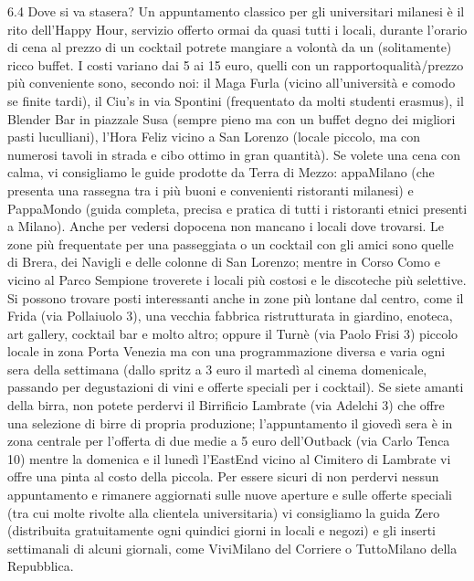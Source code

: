6.4 Dove si va stasera?
Un appuntamento classico per gli universitari milanesi è il rito dell'Happy Hour,  servizio offerto ormai da quasi tutti i locali, durante l'orario di cena al prezzo di un cocktail potrete mangiare a volontà da un (solitamente) ricco buffet. I costi variano dai 5 ai 15 euro, quelli con un rapportoqualità/prezzo più conveniente sono, secondo noi: il Maga Furla (vicino all'università e comodo se finite tardi), il Ciu's in via Spontini (frequentato da molti studenti erasmus), il Blender Bar in piazzale Susa (sempre pieno ma con un buffet degno dei migliori pasti luculliani), l'Hora Feliz vicino a San Lorenzo (locale piccolo, ma con numerosi tavoli in strada e cibo ottimo in gran quantità). Se volete una cena con calma, vi consigliamo le guide prodotte da Terra di Mezzo: appaMilano (che presenta una rassegna tra i più buoni e convenienti ristoranti milanesi) e PappaMondo (guida completa, precisa e pratica di tutti i ristoranti etnici presenti a Milano).
Anche per vedersi dopocena non mancano i locali dove trovarsi. Le zone più frequentate per una passeggiata o un cocktail con gli amici sono quelle di Brera, dei Navigli e delle colonne di San Lorenzo; mentre in Corso Como e vicino al Parco Sempione troverete i locali più costosi e le discoteche più selettive. Si possono trovare posti interessanti anche in zone più lontane dal centro, come il Frida (via Pollaiuolo 3), una vecchia fabbrica ristrutturata in giardino, enoteca, art gallery, cocktail bar e molto altro; oppure il Turnè (via Paolo Frisi 3) piccolo locale in zona Porta Venezia ma con una programmazione diversa e varia ogni sera della settimana (dallo spritz a 3 euro il martedì al cinema domenicale, passando per degustazioni di vini e offerte speciali per i cocktail).
Se siete amanti della birra, non potete perdervi il Birrificio Lambrate (via Adelchi 3) che offre una selezione di birre di propria produzione; l'appuntamento il giovedì sera è in zona centrale per l'offerta di due medie a 5 euro dell'Outback (via Carlo Tenca 10) mentre la domenica e il lunedì l'EastEnd vicino al Cimitero di Lambrate vi offre una pinta al costo della piccola. Per essere sicuri di non perdervi nessun appuntamento e rimanere aggiornati sulle nuove aperture e sulle offerte speciali (tra cui molte rivolte alla clientela universitaria) vi consigliamo la guida Zero (distribuita gratuitamente ogni quindici giorni in locali e negozi) e gli inserti settimanali di alcuni giornali, come ViviMilano del Corriere o TuttoMilano della Repubblica.

